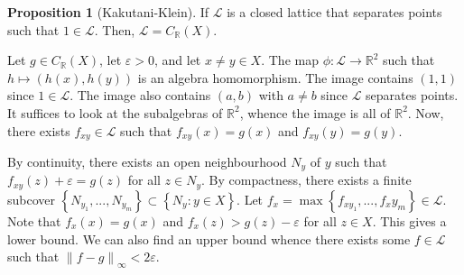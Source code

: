 \documentclass[11pt]{article}
\theoremstyle{definition}
\newtheorem{prop}[thm]{Proposition}
\newcommand{\set}[1]{\left\{ #1 \right\}}
\newcommand{\e}[0]{\varepsilon}
\newcommand{\RR}{\mathbb{R}}
\newcommand{\m}[1]{\mathcal{#1}}
\newcommand{\norm}[1]{\left\lVert#1\right\rVert} %
\begin{document}
\begin{prop}[Kakutani-Klein]
If $\m{L}$ is a closed lattice that separates points such that $1\in\m{L}$. Then,
$\m{L}=C_\RR(X)$.
\end{prop}
\proof
Let $g\in C_\RR(X)$, let $\e>0$, and let $x\neq y\in X$. The map $\phi:\m{L}\to\RR^2$ such
that $h\mapsto(h(x),h(y))$ is an algebra homomorphism. The image contains $(1,1)$ since
$1\in\m{L}$. The image also contains $(a,b)$ with $a\neq b$ since $\m{L}$ separates points.
It suffices to look at the subalgebras of $\RR^2$, whence the image is all of $\RR^2$. Now,
there exists $f_{xy}\in\m{L}$ such that $f_{xy}(x)=g(x)$ and $f_{xy}(y)=g(y)$.

By continuity, there exists an open neighbourhood $N_y$ of $y$ such that
$f_{xy}(z)+\e=g(z)$ for all $z\in N_y$. By compactness, there exists a finite subcover
$\set{N_{y_1},...,N_{y_m}}\subset\set{N_y:y\in X}$. Let
$f_x=\max\set{f_{xy_1},...,f_xy_m}\in\m{L}$. Note that $f_x(x)=g(x)$ and $f_x(z)>g(z)-\e$
for all $z\in X$. This gives a lower bound. We can also find an upper bound whence there
exists some $f\in\m{L}$ such that $\norm{f-g}_\infty<2\e$.
\qedhere








\end{document}
